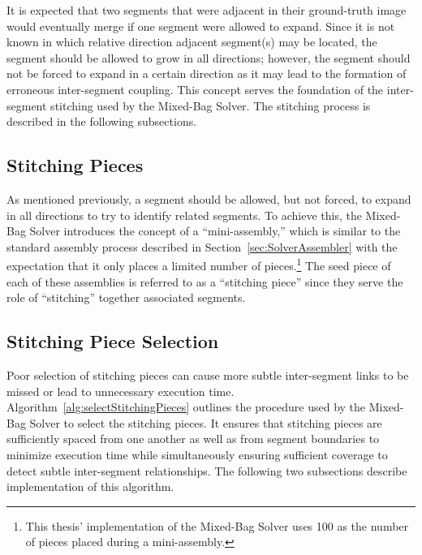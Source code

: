It is expected that two segments that were adjacent in their ground-truth image would eventually merge if one segment were allowed to expand. Since it is not known in which relative direction adjacent segment(s) may be located, the segment should be allowed to grow in all directions; however, the segment should not be forced to expand in a certain direction as it may lead to the formation of erroneous inter-segment coupling.  This concept serves the foundation of the inter-segment stitching used by the Mixed-Bag Solver.  The stitching process is described in the following subsections.

\subsection{Stitching Pieces}

As mentioned previously, a segment should be allowed, but not forced, to expand in all directions to try to identify related segments.  To achieve this, the Mixed-Bag Solver introduces the concept of a ``mini-assembly,'' which is similar to the standard assembly process described in Section~\ref{sec:SolverAssembler} with the expectation that it only places a limited number of pieces.\footnote{This thesis' implementation of the Mixed-Bag Solver uses 100 as the number of pieces placed during a mini-assembly.}  The seed piece of each of these assemblies is referred to as a ``stitching piece'' since they serve the role of ``stitching'' together associated segments.

\subsection{Stitching Piece Selection}\label{sec:stitchingPieceSelection}

Poor selection of stitching pieces can cause more subtle inter-segment links to be missed or lead to unnecessary execution time.  Algorithm~\ref{alg:selectStitchingPieces} outlines the procedure used by the Mixed-Bag Solver to select the stitching pieces.  It ensures that stitching pieces are sufficiently spaced from one another as well as from segment boundaries to minimize execution time while simultaneously ensuring sufficient coverage to detect subtle inter-segment relationships.  The following two subsections describe implementation of this algorithm.

